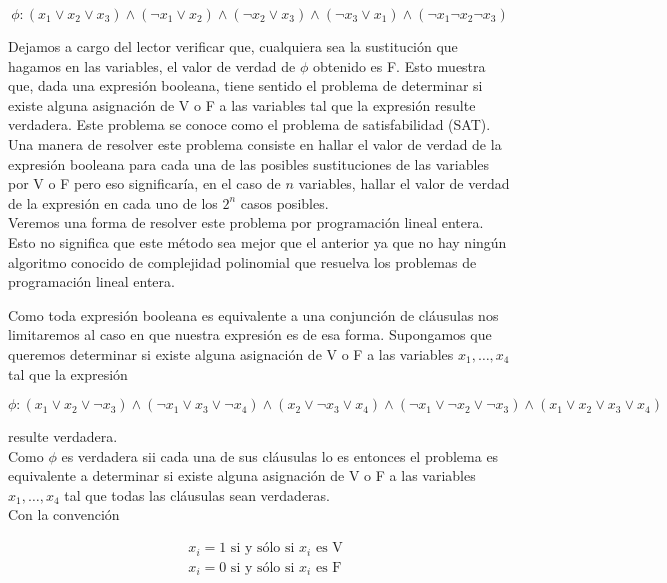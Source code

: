\documentclass[10pt]{article}
\begin{document}
$$
\phi:\left(x_{1} \vee x_{2} \vee x_{3}\right) \wedge\left(\neg x_{1} \vee x_{2}\right) \wedge\left(\neg x_{2} \vee x_{3}\right) \wedge\left(\neg x_{3} \vee x_{1}\right) \wedge\left(\neg x_{1} \neg x_{2} \neg x_{3}\right)
$$

Dejamos a cargo del lector verificar que, cualquiera sea la sustitución que hagamos en las variables, el valor de verdad de $\phi$ obtenido es F. Esto muestra que, dada una expresión booleana, tiene sentido el problema de determinar si existe alguna asignación de V o F a las variables tal que la expresión resulte verdadera. Este problema se conoce como el problema de satisfabilidad (SAT).\\
Una manera de resolver este problema consiste en hallar el valor de verdad de la expresión booleana para cada una de las posibles sustituciones de las variables por V o F pero eso significaría, en el caso de $n$ variables, hallar el valor de verdad de la expresión en cada uno de los $2^{n}$ casos posibles.\\
Veremos una forma de resolver este problema por programación lineal entera. Esto no significa que este método sea mejor que el anterior ya que no hay ningún algoritmo conocido de complejidad polinomial que resuelva los problemas de programación lineal entera.

Como toda expresión booleana es equivalente a una conjunción de cláusulas nos limitaremos al caso en que nuestra expresión es de esa forma. Supongamos que queremos determinar si existe alguna asignación de V o F a las variables $x_{1}, \ldots, x_{4}$ tal que la expresión

$$
\phi:\left(x_{1} \vee x_{2} \vee \neg x_{3}\right) \wedge\left(\neg x_{1} \vee x_{3} \vee \neg x_{4}\right) \wedge\left(x_{2} \vee \neg x_{3} \vee x_{4}\right) \wedge\left(\neg x_{1} \vee \neg x_{2} \vee \neg x_{3}\right) \wedge\left(x_{1} \vee x_{2} \vee x_{3} \vee x_{4}\right)
$$

resulte verdadera.\\
Como $\phi$ es verdadera sii cada una de sus cláusulas lo es entonces el problema es equivalente a determinar si existe alguna asignación de V o F a las variables $x_{1}, \ldots, x_{4}$ tal que todas las cláusulas sean verdaderas.\\
Con la convención

$$
\begin{aligned}
& x_{i}=1 \text { si y sólo si } x_{i} \text { es } \mathrm{V} \\
& x_{i}=0 \text { si y sólo si } x_{i} \text { es } \mathrm{F}
\end{aligned}
$$
\end{document}
